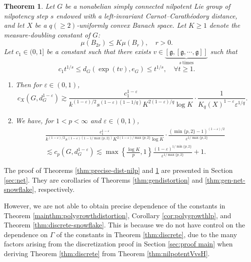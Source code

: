 \documentclass[11pt,reqno]{amsart}
\newtheorem{theorem}{Theorem}
\newcommand{\1}{\mathbf 1}
\begin{document}
\begin{theorem}\label{thm:precise-holder-nilp}
Let $G$ be a nonabelian simply connected nilpotent Lie group of nilpotency step $s$ endowed with a left-invariant Carnot--Carath\'eodory distance, and let $X$ be a $q(\ge 2)$-uniformly convex Banach space. Let $K\ge 1$ denote the measure-doubling constant of $G$:
\[
\mu\left(B_{2r}\right)\le K\mu\left(B_r\right),\quad r>0.
\]
Let $c_1\in (0,1]$ be a constant such that there exists $v\in \underbrace{\left[\mathfrak{g},\left[\mathfrak{g},\cdots,\mathfrak{g}\right]\right]}_{s~\mathrm{times}}$ such that
\[
c_1t^{1/s}\le d_G\left(\exp\left(tv\right),e_G\right)\le  t^{1/s}, \quad \forall t\ge 1.
\]
\begin{enumerate}
    \item Then for $\varepsilon\in (0,1)$,
\[
c_X\left(G,d_G^{1-\varepsilon}\right)\gtrsim \frac{c_1^{1-\varepsilon}}{k^{(1-\varepsilon)/2}s^{(1-\varepsilon)(1-1/q)}K^{2(1-\varepsilon)/q}\log K} \cdot\frac{1}{K_q\left(X\right)^{1-\varepsilon}\varepsilon^{1/q}}.
\]
\item We have, for $1<p<\infty$ and $\varepsilon\in (0,1)$,
\begin{align*}
&\frac{c_1^{1-\varepsilon}}{k^{(1-\varepsilon)/2}s^{(1-\varepsilon)(1-1/\max\{p,2\})}K^{2(1-\varepsilon)/\max\{p,2\}}\log K} \cdot \frac{\left(\min\{p,2\}-1\right)^{(1-\varepsilon)/2}}{\varepsilon^{1/\max\{p,2\}}}\\
&\lesssim c_p\left(G,d_G^{1-\varepsilon}\right)\lesssim \max\left\{\frac{\log K}{p},1\right\}\frac{(1-\varepsilon)^{1/\min\{p,2\}}}{\varepsilon^{1/\max\{p,2\}}}+1.
\end{align*}
\end{enumerate}

\end{theorem}
The proof of Theorems \ref{thm:precise-dist-nilp} and \ref{thm:precise-holder-nilp} are presented in Section \ref{sec:net}. They are corollaries of Theorems \ref{thm:gendistortion} and \ref{thm:gen-net-snowflake}, respectively.

However, we are not able to obtain precise dependence of the constants in Theorem \ref{mainthm:polygrowthdistortion}, Corollary \ref{cor:polygrowthlp}, and Theorem \ref{thm:discrete-snowflake}. This is because we do not have control on the dependence on $\Gamma$ of the constants in Theorem \ref{thm:discrete}, due to the many factors arising from the discretization proof in Section \ref{sec:proof main} when deriving Theorem \ref{thm:discrete} from Theorem \ref{thm:nilpotentVvsH}.
\end{document}

